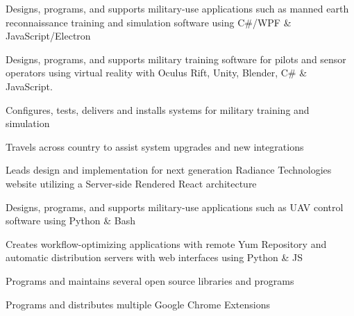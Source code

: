 \documentclass[]{resume}
\begin{document}
\begin{minipage}[t]{0.69\textwidth}
\sectionsep

\begin{tightemize}
\item Designs, programs, and supports military-use applications such as manned earth reconnaissance training and simulation software using C\#/WPF \& JavaScript/Electron
\item Designs, programs, and supports military training software for pilots and sensor operators using virtual reality with Oculus Rift, Unity, Blender, C\# \& JavaScript.
\item Configures, tests, delivers and installs systems for military training and simulation
\item Travels across country to assist system upgrades and new integrations
\item Leads design and implementation for next generation Radiance Technologies website utilizing a Server-side Rendered React architecture
\end{tightemize}

\sectionsep

\begin{tightemize}
\item Designs, programs, and supports military-use applications such as UAV control software using Python \& Bash
\item Creates workflow-optimizing applications with remote Yum Repository and automatic distribution servers with web interfaces using Python \& JS
\end{tightemize}

\sectionsep

\descript{}
\begin{tightemize}
\item Programs and maintains several open source libraries and programs
\item Programs and distributes multiple Google Chrome Extensions
\end{tightemize}


\end{minipage}
\end{document}
